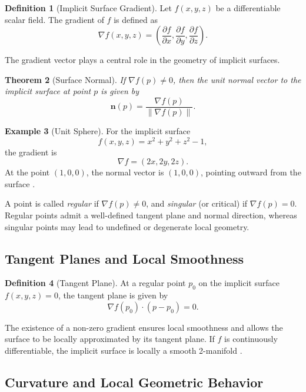 \documentclass[12pt, a4paper, oneside]{book}
\theoremstyle{plain}
\newtheorem{theorem}{Theorem}[chapter]
\theoremstyle{definition}
\newtheorem{definition}[theorem]{Definition}
\newtheorem{example}[theorem]{Example}
\theoremstyle{remark}
\theoremstyle{definition}
\begin{document}
\begin{definition}[Implicit Surface Gradient]
Let $f(x,y,z)$ be a differentiable scalar field. The gradient of $f$ is defined as
\[
\nabla f(x,y,z) = \left(\frac{\partial f}{\partial x}, \frac{\partial f}{\partial y}, \frac{\partial f}{\partial z}\right).
\]
\end{definition}

The gradient vector plays a central role in the geometry of implicit surfaces.

\begin{theorem}[Surface Normal]
If $\nabla f(p) \neq 0$, then the unit normal vector to the implicit surface at point $p$ is given by
\[
\mathbf{n}(p) = \frac{\nabla f(p)}{\|\nabla f(p)\|}.
\]
\end{theorem}

\begin{example}[Unit Sphere]
For the implicit surface
\[
f(x,y,z) = x^2 + y^2 + z^2 - 1,
\]
the gradient is
\[
\nabla f = (2x,2y,2z).
\]
At the point $(1,0,0)$, the normal vector is $(1,0,0)$, pointing outward from the surface \cite{bloomenthal2000implicit}.
\end{example}

A point is called \emph{regular} if $\nabla f(p) \neq 0$, and \emph{singular} (or critical) if $\nabla f(p) = 0$. Regular points admit a well-defined tangent plane and normal direction, whereas singular points may lead to undefined or degenerate local geometry.

\subsection{Tangent Planes and Local Smoothness}

\begin{definition}[Tangent Plane]
At a regular point $p_0$ on the implicit surface $f(x,y,z)=0$, the tangent plane is given by
\[
\nabla f(p_0) \cdot (p - p_0) = 0.
\]
\end{definition}

The existence of a non-zero gradient ensures local smoothness and allows the surface to be locally approximated by its tangent plane. If $f$ is continuously differentiable, the implicit surface is locally a smooth 2-manifold \cite{bloomenthal2000implicit}.

\subsection{Curvature and Local Geometric Behavior}
\end{document}

